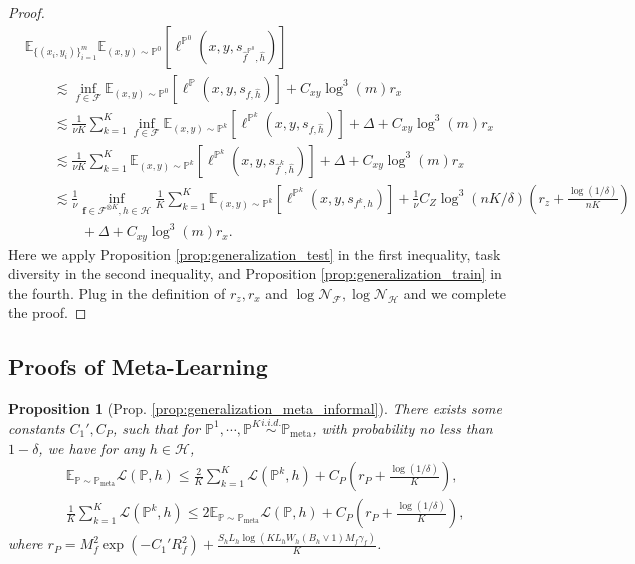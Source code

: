 \documentclass{article}
\numberwithin{equation}{section}
\def\vf{{\bm{f}}}
\newcommand{\E}{\mathbb{E}}
\newtheorem{prop}[thm]{Proposition}
\theoremstyle{definition}
\newcommand{\Pmeta}{\mathbb{P}_{\text{meta}}}
\renewcommand{\P}{\mathbb{P}}
\begin{document}
\begin{proof}
    \begin{equation}
        \begin{aligned}
            &\E_{\{(x_i,y_i)\}_{i=1}^m} \E_{(x,y)\sim\P^0} [\ell^{\P^0}(x,y,s_{\widehat{f}^{\P^0},\widehat{h}})] \\
            &\qquad \lesssim \inf_{f\in\mathcal{F}} \E_{(x,y)\sim\P^0} [\ell^\P(x,y,s_{f,\widehat{h}})]+C_{xy}\log^3(m)r_x \\
            &\qquad \lesssim \frac{1}{\nu K}\sum_{k=1}^K\inf_{f\in\mathcal{F}} \E_{(x,y)\sim\P^k} [\ell^{\P^k}(x,y,s_{f,\widehat{h}})]+\Delta+C_{xy}\log^3(m)r_x \\
            &\qquad \lesssim \frac{1}{\nu K}\sum_{k=1}^K \E_{(x,y)\sim\P^k} [\ell^{\P^k}(x,y,s_{\widehat{f}^k,\widehat{h}})]+\Delta+C_{xy}\log^3(m)r_x \\
            &\qquad \lesssim \frac{1}{\nu}\inf_{\vf\in\mathcal{F}^{\otimes K},h\in\mathcal{H}} \frac{1}{K}\sum_{k=1}^K \E_{(x,y)\sim\P^k} [\ell^{\P^k}(x,y,s_{f^k,h})]+\frac{1}{\nu}C_Z\log^3(nK/\delta)\left(r_z+\frac{\log(1/\delta)}{nK}\right) \\
            &\qquad\qquad +\Delta+C_{xy}\log^3(m)r_x.
        \end{aligned}
    \end{equation}
    Here we apply Proposition \ref{prop:generalization_test} in the first inequality, task diversity in the second inequality, and Proposition \ref{prop:generalization_train} in the fourth. 
    Plug in the definition of $r_z,r_x$ and $\log\mathcal{N}_\mathcal{F},\log\mathcal{N}_\mathcal{H}$ and we complete the proof.
\end{proof}

\subsection{Proofs of Meta-Learning}\label{app:subsec:generalization}

\begin{prop}[Prop. \ref{prop:generalization_meta_informal}]\label{prop:generalization_meta}
    There exists some constants $C_1',C_P$, such that for $\P^1,\cdots,\P^K\overset{\textit{i.i.d.}}{\sim}\Pmeta$, 
    with probability no less than $1-\delta$, we have for any $h\in\mathcal{H}$,
    \begin{align}
        &\E_{\P\sim\Pmeta}\mathcal{L}(\P,h)
        \leq \frac{2}{K}\sum_{k=1}^K\mathcal{L}(\P^k,h)+C_P\left(r_P+\frac{\log(1/\delta)}{K}\right), \\
        &\frac{1}{K}\sum_{k=1}^K\mathcal{L}(\P^k,h)\leq 2\E_{\P\sim\Pmeta}\mathcal{L}(\P,h)
        +C_P\left(r_P+\frac{\log(1/\delta)}{K}\right),
    \end{align}
    where $r_P=M_f^2\exp(-C_1'R_f^2)+\frac{S_hL_h\log\left(KL_hW_h(B_h\vee 1)M_f\gamma_f\right)}{K}$.
\end{prop}
\end{document}
